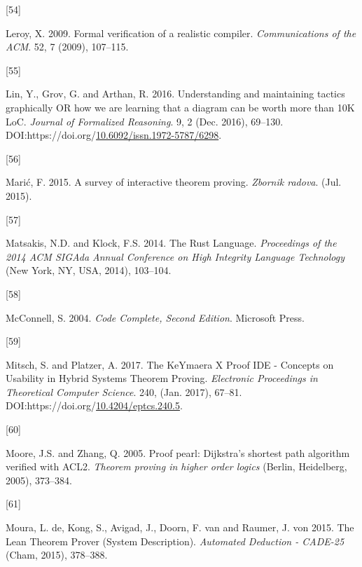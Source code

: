 \documentclass[
]{article}
\newlength{\cslhangindent}
\newlength{\csllabelwidth}
\newlength{\cslentryspacingunit} %
\newenvironment{CSLReferences}[2] %
 {%
  \setlength{\parindent}{0pt}
  \ifodd #1
  \let\oldpar\par
  \def\par{\hangindent=\cslhangindent\oldpar}
  \fi
  \setlength{\parskip}{#2\cslentryspacingunit}
 }%
 {}
\newcommand{\CSLLeftMargin}[1]{\parbox[t]{\csllabelwidth}{#1}}
\newcommand{\CSLRightInline}[1]{\parbox[t]{\linewidth - \csllabelwidth}{#1}\break}
\begin{document}
\begin{CSLReferences}{0}{0}
\leavevmode{}%
\CSLLeftMargin{{[}54{]} }
\CSLRightInline{Leroy, X. 2009. Formal verification of a realistic
compiler. \emph{Communications of the ACM}. 52, 7 (2009), 107--115.}

\leavevmode{}%
\CSLLeftMargin{{[}55{]} }
\CSLRightInline{Lin, Y., Grov, G. and Arthan, R. 2016. Understanding and
maintaining tactics graphically {OR} how we are learning that a diagram
can be worth more than {10K} {LoC}. \emph{Journal of Formalized
Reasoning}. 9, 2 (Dec. 2016), 69--130.
DOI:https://doi.org/\href{https://doi.org/10.6092/issn.1972-5787/6298}{10.6092/issn.1972-5787/6298}.}

\leavevmode{}%
\CSLLeftMargin{{[}56{]} }
\CSLRightInline{Marić, F. 2015. A survey of interactive theorem proving.
\emph{Zbornik radova}. (Jul. 2015).}

\leavevmode{}%
\CSLLeftMargin{{[}57{]} }
\CSLRightInline{Matsakis, N.D. and Klock, F.S. 2014. The {Rust}
{Language}. \emph{Proceedings of the 2014 {ACM} {SIGAda} {Annual}
{Conference} on {High} {Integrity} {Language} {Technology}} (New York,
NY, USA, 2014), 103--104.}

\leavevmode{}%
\CSLLeftMargin{{[}58{]} }
\CSLRightInline{McConnell, S. 2004. \emph{Code {Complete}, {Second}
{Edition}}. Microsoft Press.}

\leavevmode{}%
\CSLLeftMargin{{[}59{]} }
\CSLRightInline{Mitsch, S. and Platzer, A. 2017. The {KeYmaera} {X}
{Proof} {IDE} - {Concepts} on {Usability} in {Hybrid} {Systems}
{Theorem} {Proving}. \emph{Electronic Proceedings in Theoretical
Computer Science}. 240, (Jan. 2017), 67--81.
DOI:https://doi.org/\href{https://doi.org/10.4204/eptcs.240.5}{10.4204/eptcs.240.5}.}

\leavevmode{}%
\CSLLeftMargin{{[}60{]} }
\CSLRightInline{Moore, J.S. and Zhang, Q. 2005. Proof pearl: Dijkstra's
shortest path algorithm verified with ACL2. \emph{Theorem proving in
higher order logics} (Berlin, Heidelberg, 2005), 373--384.}

\leavevmode{}%
\CSLLeftMargin{{[}61{]} }
\CSLRightInline{Moura, L. de, Kong, S., Avigad, J., Doorn, F. van and
Raumer, J. von 2015. The {Lean} {Theorem} {Prover} ({System}
{Description}). \emph{Automated {Deduction} - {CADE}-25} (Cham, 2015),
378--388.}


\end{CSLReferences}
\end{document}

